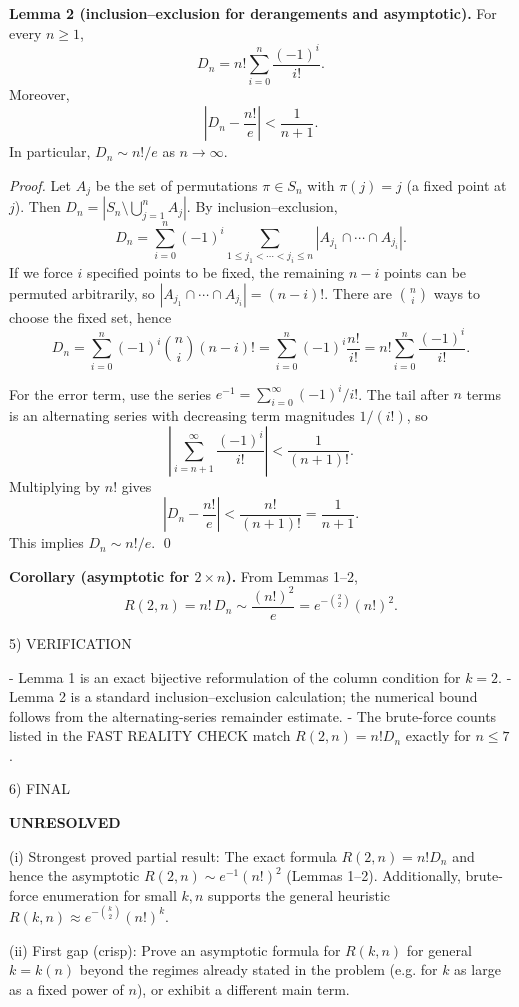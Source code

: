 \medskip

\textbf{Lemma 2 (inclusion--exclusion for derangements and asymptotic).}
For every $n\ge 1$,
\[
D_n = n!\sum_{i=0}^n \frac{(-1)^i}{i!}.
\]
Moreover,
\[
\left|D_n - \frac{n!}{e}\right| < \frac{1}{n+1}.
\]
In particular, $D_n\sim n!/e$ as $n\to\infty$.

\emph{Proof.}
Let $A_j$ be the set of permutations $\pi\in S_n$ with $\pi(j)=j$ (a fixed point at $j$).
Then $D_n = |S_n\setminus\bigcup_{j=1}^n A_j|$.
By inclusion--exclusion,
\[
D_n = \sum_{i=0}^n (-1)^i\sum_{1\le j_1<\cdots<j_i\le n} |A_{j_1}\cap\cdots\cap A_{j_i}|.
\]
If we force $i$ specified points to be fixed, the remaining $n-i$ points can be permuted arbitrarily, so
$|A_{j_1}\cap\cdots\cap A_{j_i}|=(n-i)!$.
There are $\binom{n}{i}$ ways to choose the fixed set, hence
\[
D_n = \sum_{i=0}^n (-1)^i\binom{n}{i}(n-i)! = \sum_{i=0}^n (-1)^i\frac{n!}{i!} = n!\sum_{i=0}^n \frac{(-1)^i}{i!}.
\]

For the error term, use the series $e^{-1}=\sum_{i=0}^{\infty}(-1)^i/i!$.
The tail after $n$ terms is an alternating series with decreasing term magnitudes $1/(i!)$, so
\[
\left|\sum_{i=n+1}^{\infty} \frac{(-1)^i}{i!}\right| < \frac{1}{(n+1)!}.
\]
Multiplying by $n!$ gives
\[
\left|D_n - \frac{n!}{e}\right| < \frac{n!}{(n+1)!} = \frac{1}{n+1}.
\]
This implies $D_n\sim n!/e$.
\qed

\medskip

\textbf{Corollary (asymptotic for $2\times n$).}
From Lemmas 1--2,
\[
R(2,n)=n!\,D_n \sim \frac{(n!)^2}{e} = e^{-\binom{2}{2}}(n!)^2.
\]

5) VERIFICATION

- Lemma 1 is an exact bijective reformulation of the column condition for $k=2$.
- Lemma 2 is a standard inclusion--exclusion calculation; the numerical bound follows from the alternating-series remainder estimate.
- The brute-force counts listed in the FAST REALITY CHECK match $R(2,n)=n!D_n$ exactly for $n\le 7$.

6) FINAL

\textbf{UNRESOLVED}

(i) Strongest proved partial result: The exact formula $R(2,n)=n!D_n$ and hence the asymptotic $R(2,n)\sim e^{-1}(n!)^2$ (Lemmas 1--2). Additionally, brute-force enumeration for small $k,n$ supports the general heuristic $R(k,n)\approx e^{-\binom{k}{2}}(n!)^k$.

(ii) First gap (crisp): Prove an asymptotic formula for $R(k,n)$ for general $k=k(n)$ beyond the regimes already stated in the problem (e.g. for $k$ as large as a fixed power of $n$), or exhibit a different main term.

